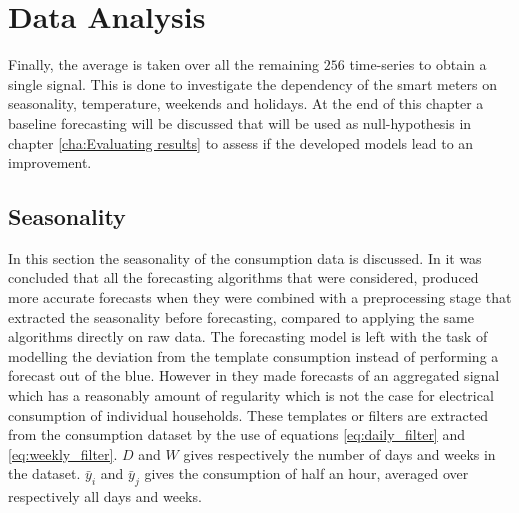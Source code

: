 
\section{Data Analysis}\label{s:Data Analysis}
Finally, the average is taken over all the remaining $256$ time-series to obtain a single signal. This is done to investigate the dependency of the smart meters on seasonality, temperature, weekends and holidays. At the end of this chapter a baseline forecasting will be discussed that will be used as null-hypothesis in chapter \ref{cha:Evaluating results} to assess if the developed models lead to an improvement.

 


\subsection{Seasonality}
In this section the seasonality of the consumption data is discussed. In \cite{Hoverstad2015}it was concluded that all the forecasting algorithms that were considered, produced more accurate forecasts when they were combined with a preprocessing stage that extracted the seasonality before forecasting, compared to applying the same algorithms directly on raw data. The forecasting model is left with the task of modelling the deviation from the template consumption instead of performing a forecast out of the blue. However in \cite{Hoverstad2015} they made forecasts of an aggregated signal which has a reasonably amount of regularity which is not the case for electrical consumption of individual households. These templates or filters are extracted from the consumption dataset by the use of equations \ref{eq:daily_filter} and \ref{eq:weekly_filter}. $ D $ and $ W $ gives respectively the number of days and weeks in the dataset. $\bar{y}_i$ and $\bar{y}_j$ gives the consumption of half an hour, averaged over respectively all days and weeks. 

